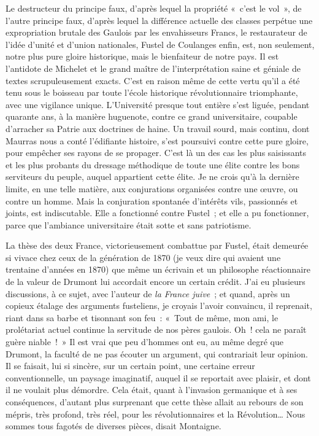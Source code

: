 \documentclass[french,twoside]{book} %
\begin{document}
Le destructeur du principe faux, d’après lequel la propriété « c’est le vol », de l’autre principe faux, d’après lequel la différence actuelle des classes perpétue une expropriation brutale des Gaulois par les envahisseurs Francs, le restaurateur de l’idée d’unité et d’union nationales, Fustel de Coulanges enfin, est, non seulement, notre plus pure gloire historique, mais le bienfaiteur de notre pays. Il est l’antidote de Michelet et le grand maître de l’interprétation saine et géniale de textes scrupuleusement exacts. C’est en raison même de cette vertu qu’il a été tenu sous le boisseau par toute l’école historique révolutionnaire triomphante, avec une vigilance unique. L’Université presque tout entière s’est liguée, pendant quarante ans, à la manière huguenote, contre ce grand universitaire, coupable d’arracher sa Patrie aux doctrines de haine. Un travail sourd, mais continu, dont Maurras nous a conté l’édifiante histoire, s’est poursuivi contre cette pure gloire, pour empêcher ses rayons de se propager. C’est là un des cas les plus saisissants et les plus probants du dressage méthodique de toute une élite contre les bons serviteurs du peuple, auquel appartient cette élite. Je ne crois qu’à la dernière limite, en une telle matière, aux conjurations organisées contre une œuvre, ou contre un homme. Mais la conjuration spontanée d’intérêts vils, passionnés et joints, est indiscutable. Elle a fonctionné contre Fustel ; et elle a pu fonctionner, parce que l’ambiance universitaire était sotte et sans patriotisme.\par
La thèse des deux France, victorieusement combattue par Fustel, était demeurée si vivace chez ceux de la génération de 1870 (je veux dire qui avaient une trentaine d’années en 1870) que même un écrivain et un philosophe réactionnaire de la valeur de Drumont lui accordait encore un certain crédit. J’ai eu plusieurs discussions, à ce sujet, avec l’auteur de {\itshape la France juive} ; et quand, après un copieux étalage des arguments fusteliens, je croyais l’avoir convaincu, il reprenait, riant dans sa barbe et tisonnant son feu : « Tout de même, mon ami, le prolétariat actuel continue la servitude de nos pères gaulois. Oh ! cela ne paraît guère niable ! » Il est vrai que peu d’hommes ont eu, au même degré que Drumont, la faculté de ne pas écouter un argument, qui contrariait leur opinion. Il se faisait, lui si sincère, sur un certain point, une certaine erreur conventionnelle, un paysage imaginatif, auquel il se reportait avec plaisir, et dont il ne voulait plus démordre. Cela était, quant à l’invasion germanique et à ses conséquences, d’autant plus surprenant que cette thèse allait au rebours de son mépris, très profond, très réel, pour les révolutionnaires et la Révolution… Nous sommes tous fagotés de diverses pièces, disait Montaigne.\par
\end{document}
